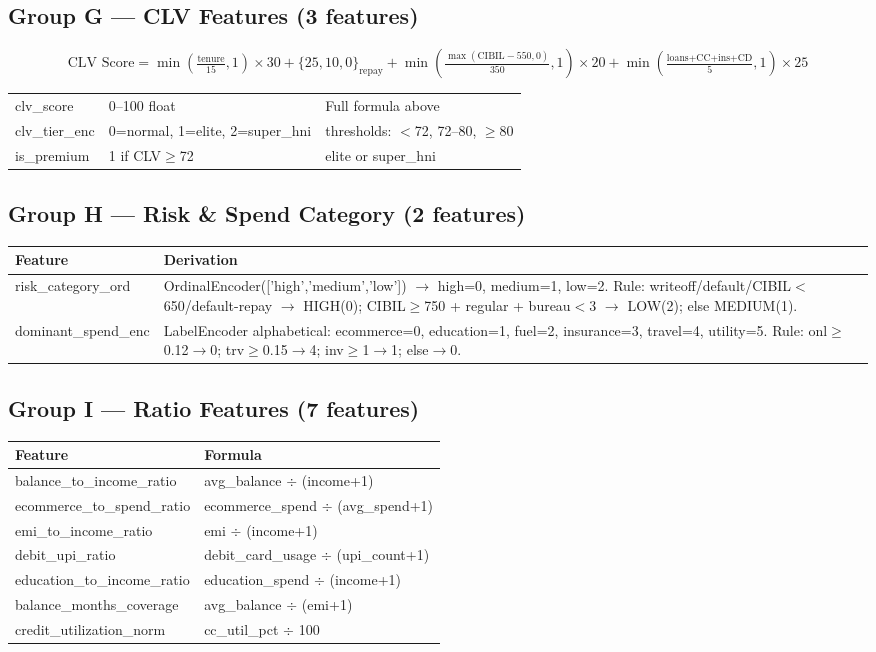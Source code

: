 \documentclass[12pt,a4paper]{article}
\begin{document}
\subsection{Group G — CLV Features (3 features)}

\[
\text{CLV Score} = \min\!\left(\tfrac{\text{tenure}}{15},1\right){\times}30 +
\{25,10,0\}_\text{repay} +
\min\!\left(\tfrac{\max(\text{CIBIL}-550,0)}{350},1\right){\times}20 +
\min\!\left(\tfrac{\text{loans+CC+ins+CD}}{5},1\right){\times}25
\]

\begin{tabular}{lll}
clv\_score & 0--100 float & Full formula above \\
clv\_tier\_enc & 0=normal, 1=elite, 2=super\_hni & thresholds: $<$72, 72--80, $\geq$80 \\
is\_premium & 1 if CLV$\geq$72 & elite or super\_hni \\
\end{tabular}

\subsection{Group H — Risk \& Spend Category (2 features)}

\begin{tabular}{lp{10cm}}
\toprule
\textbf{Feature} & \textbf{Derivation} \\
\midrule
risk\_category\_ord &
OrdinalEncoder(['high','medium','low']) $\rightarrow$ high=0, medium=1, low=2.
Rule: writeoff/default/CIBIL$<$650/default-repay $\rightarrow$ HIGH(0);
CIBIL$\geq$750 + regular + bureau$<$3 $\rightarrow$ LOW(2); else MEDIUM(1). \\
dominant\_spend\_enc &
LabelEncoder alphabetical: ecommerce=0, education=1, fuel=2, insurance=3, travel=4, utility=5.
Rule: onl$\geq$0.12$\rightarrow$0; trv$\geq$0.15$\rightarrow$4; inv$\geq$1$\rightarrow$1; else$\rightarrow$0. \\
\bottomrule
\end{tabular}

\subsection{Group I — Ratio Features (7 features)}

\begin{tabular}{ll}
\toprule
\textbf{Feature} & \textbf{Formula} \\
\midrule
balance\_to\_income\_ratio   & avg\_balance $\div$ (income+1) \\
ecommerce\_to\_spend\_ratio  & ecommerce\_spend $\div$ (avg\_spend+1) \\
emi\_to\_income\_ratio       & emi $\div$ (income+1) \\
debit\_upi\_ratio            & debit\_card\_usage $\div$ (upi\_count+1) \\
education\_to\_income\_ratio & education\_spend $\div$ (income+1) \\
balance\_months\_coverage    & avg\_balance $\div$ (emi+1) \\
credit\_utilization\_norm    & cc\_util\_pct $\div$ 100 \\
\bottomrule
\end{tabular}
\end{document}
